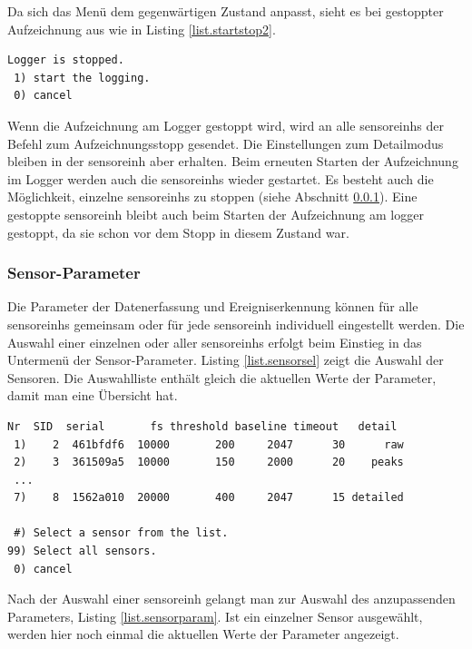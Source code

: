Da sich das Menü dem gegenwärtigen Zustand anpasst, sieht es bei gestoppter Aufzeichnung aus wie in Listing \ref{list.startstop2}.

\begin{lstlisting}[caption=Untermenü Starten der Aufzeichnung, label=list.startstop2]
 Logger is stopped.
 1) start the logging.
 0) cancel
\end{lstlisting}

Wenn die Aufzeichnung am Logger gestoppt wird, wird an alle \glspl{sensoreinh} der Befehl zum Aufzeichnungsstopp gesendet. Die Einstellungen zum Detailmodus bleiben in der \gls{sensoreinh} aber erhalten. Beim erneuten Starten der Aufzeichnung im Logger werden auch die \glspl{sensoreinh} wieder gestartet. Es besteht auch die Möglichkeit, einzelne \glspl{sensoreinh} zu stoppen (siehe Abschnitt \ref{sssec.sensorparam}). Eine gestoppte \gls{sensoreinh} bleibt auch beim Starten der Aufzeichnung am \gls{logger} gestoppt, da sie schon vor dem Stopp in diesem Zustand war.

\subsubsection{Sensor-Parameter}\label{sssec.sensorparam}
Die Parameter der Datenerfassung und Ereigniserkennung können für alle \glspl{sensoreinh} gemeinsam oder für jede \gls{sensoreinh} individuell eingestellt werden. Die Auswahl einer einzelnen oder aller \glspl{sensoreinh} erfolgt beim Einstieg in das Untermenü der Sensor-Parameter. Listing \ref{list.sensorsel} zeigt die Auswahl der Sensoren. Die Auswahlliste enthält gleich die aktuellen Werte der Parameter, damit man eine Übersicht hat.


\begin{lstlisting}[caption=Untermenü Sensor-Auswahl, label=list.sensorsel]
 Nr  SID  serial       fs threshold baseline timeout   detail
 1)    2  461bfdf6  10000       200     2047      30      raw
 2)    3  361509a5  10000       150     2000      20    peaks
 ...
 7)    8  1562a010  20000       400     2047      15 detailed
 
 #) Select a sensor from the list.
99) Select all sensors.
 0) cancel
\end{lstlisting}

Nach der Auswahl einer \gls{sensoreinh} gelangt man zur Auswahl des anzupassenden Parameters, Listing \ref{list.sensorparam}. Ist ein einzelner Sensor ausgewählt, werden hier noch einmal die aktuellen Werte der Parameter angezeigt.

